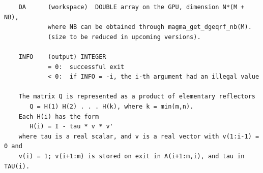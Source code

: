 \documentclass[10pt]{book}
\begin{document}
\begin{verbatim}
    DA      (workspace)  DOUBLE array on the GPU, dimension N*(M + NB), 
            where NB can be obtained through magma_get_dgeqrf_nb(M).
            (size to be reduced in upcoming versions).

    INFO    (output) INTEGER   
            = 0:  successful exit   
            < 0:  if INFO = -i, the i-th argument had an illegal value   
  
    The matrix Q is represented as a product of elementary reflectors   
       Q = H(1) H(2) . . . H(k), where k = min(m,n).   
    Each H(i) has the form   
       H(i) = I - tau * v * v'   
    where tau is a real scalar, and v is a real vector with v(1:i-1) = 0 and 
    v(i) = 1; v(i+1:m) is stored on exit in A(i+1:m,i), and tau in TAU(i).   
\end{verbatim}

\newpage
\end{document}
